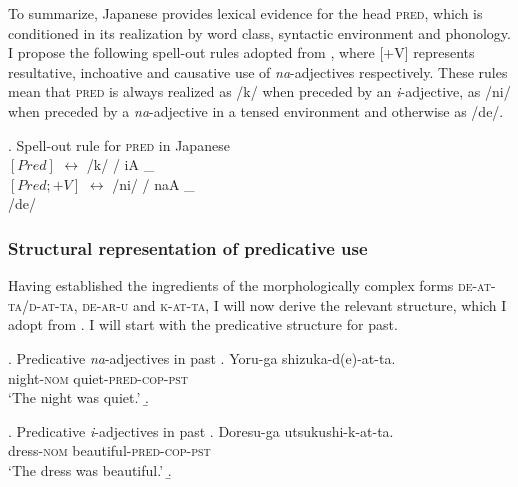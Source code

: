 \documentclass [output=book,colorlinks,citecolor=brown]{langscibook}
\begin{document}
To summarize, Japanese provides lexical evidence for the head \textsc{pred}, which is conditioned in its realization by word class, syntactic environment and phonology. I propose the following spell-out rules adopted from \citet[207]{nishiyama:1999:adj}, where [+V] represents resultative, inchoative and causative use of \textit{na}-adjectives respectively. These rules mean that \textsc{pred} is always realized as /k/ when preceded by an \textit{i}-adjective, as /ni/ when preceded by a \textit{na}-adjective in a tensed environment and otherwise as /de/.

\ex. Spell-out rule for \textsc{pred} in Japanese\\
$[Pred]$\phantom{; +V} $\leftrightarrow$ /k/ / iA \_ \\
$[Pred; +V]$ $\leftrightarrow$ /ni/ / naA \_ \\
\phantom{$[Pred; +V]$ $\leftrightarrow$} /de/

\subsubsection{Structural representation of predicative use}

Having established the ingredients of the morphologically complex forms \textsc{de-at-ta}/\textsc{d-at-ta}, \textsc{de-ar-u} and \textsc{k-at-ta}, I will now derive the relevant structure, which I adopt from \citet[189–194]{nishiyama:1999:adj}. I will start with the predicative structure for past.

\ex. Predicative \textit{na}-adjectives in past \null\hfill \citep[189, 194]{nishiyama:1999:adj}
\ag. Yoru-ga shizuka-d(e)-at-ta.\\
night-\textsc{nom} quiet-\textsc{pred-cop-pst}\\
`The night was quiet.'
\b. 

\ex. Predicative \textit{i}-adjectives in past \null\hfill \citep[190, 192]{nishiyama:1999:adj}
\ag. Doresu-ga utsukushi-k-at-ta.\\
dress-\textsc{nom} beautiful-\textsc{pred-cop-pst}\\
`The dress was beautiful.'
\b. 
\end{document}
